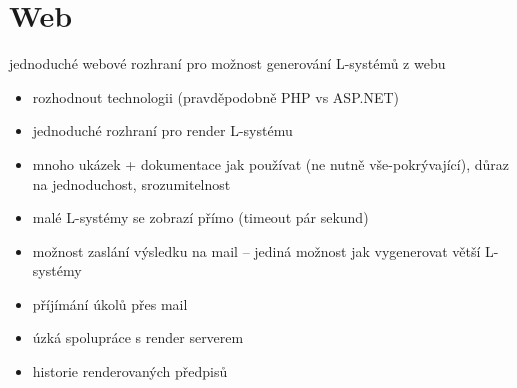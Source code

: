 \documentclass[12pt, a4paper]{article}
\begin{document}
\section{Web}
jednoduché webové rozhraní pro možnost generování L-systémů z webu

\begin{itemize}
	\item rozhodnout technologii (pravděpodobně PHP vs ASP.NET)
	
	\item jednoduché rozhraní pro render L-systému
	
	\item mnoho ukázek + dokumentace jak používat (ne nutně vše-pokrývající), důraz na jednoduchost, srozumitelnost
	
	\item malé L-systémy se zobrazí přímo (timeout pár sekund)
	
	\item možnost zaslání výsledku na mail -- jediná možnost jak vygenerovat větší L-systémy
	
	\item příjímání úkolů přes mail
	
	\item úzká spolupráce s render serverem
	
	\item historie renderovaných předpisů
\end{itemize}
\end{document}
